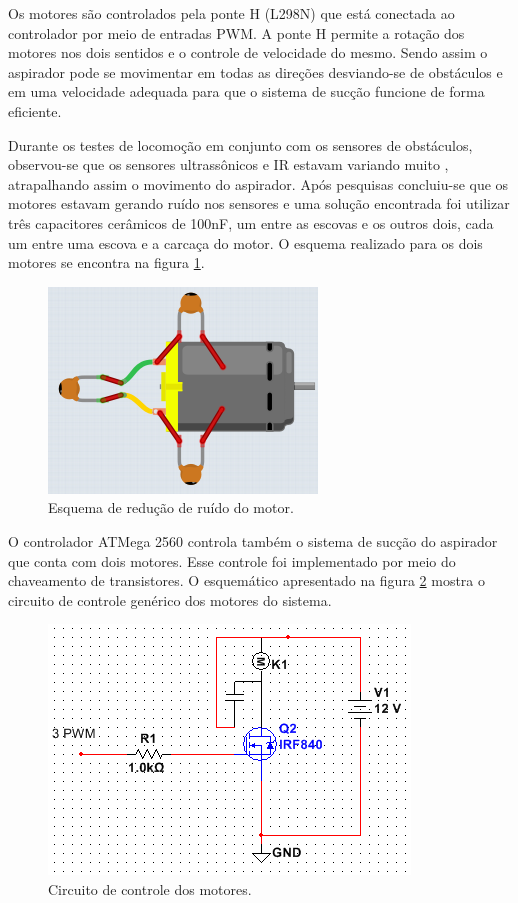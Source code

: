 		Os motores são controlados pela ponte H (L298N) que está conectada ao controlador por meio de entradas PWM. A ponte H permite a rotação dos motores nos dois sentidos e o controle de velocidade do mesmo. Sendo assim o aspirador pode se movimentar em todas as direções desviando-se de obstáculos e em uma velocidade adequada para que o sistema de sucção funcione de forma eficiente.

		Durante os testes de locomoção em conjunto com os sensores de obstáculos, observou-se que os sensores ultrassônicos e IR estavam variando muito , atrapalhando assim o movimento do aspirador. Após pesquisas concluiu-se que os motores estavam gerando ruído nos sensores e uma solução encontrada foi utilizar três capacitores cerâmicos de 100nF, um entre as escovas e os outros dois, cada um entre uma escova e a carcaça do motor. O esquema realizado para os dois motores se encontra na figura \ref{img:esquema_de_redução_de_ruido}.

		\begin{figure}[H]
			\centering
			\includegraphics[scale=0.5]{figuras/motorcap.png}
			\caption{Esquema de redução de ruído do motor.}
			\label{img:esquema_de_redução_de_ruido}
		\end{figure}

		O controlador ATMega 2560 controla também o sistema de sucção do aspirador que conta com dois motores. Esse controle foi implementado por meio do chaveamento de transistores. O esquemático apresentado na figura \ref{img:circuito_de_controle_dos_motores} mostra o circuito de controle genérico dos motores do sistema.

		\begin{figure}[H]
			\centering
			\includegraphics[scale=0.7]{figuras/chave.png}
			\caption{Circuito de controle dos motores.}
			\label{img:circuito_de_controle_dos_motores}
		\end{figure}


